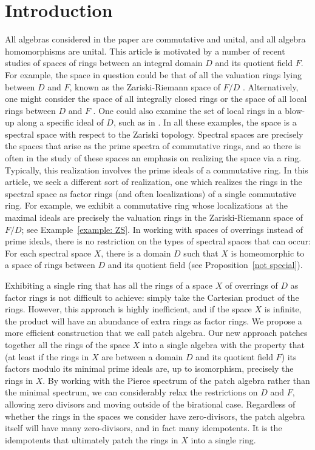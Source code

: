 \documentclass[11pt]{amsart}
\theoremstyle{definition}
\begin{document}
\tableofcontents

\section{Introduction}

All algebras considered in the paper are commutative and unital, and all algebra homomorphisms are unital. This article is motivated by a number of recent studies of spaces of rings between an integral domain $D$ and its quotient field $F$.   For example, the space in question could be that of all the valuation rings lying between $D$ and $F$, known as the Zariski-Riemann space of $F/D$ \cite{FFL,FFL3, HLOT, OZar, OIrr, Spi1, Spi2, Spi3}.  Alternatively, one might consider the space of all integrally closed rings or the space of all local rings between $D$ and $F$  \cite{Fin, FFS, FS, ONoeth}. One could also examine the set of local rings in a blow-up along a specific ideal of $D$, such as in \cite{OZar}. In all these examples, the space is a spectral space with respect to the Zariski topology. Spectral spaces are precisely the spaces that arise as the prime spectra of commutative rings, and so there is often in the study of these spaces an emphasis on realizing the space via a ring. Typically, this realization involves the prime ideals of a commutative ring.  In this article, we seek a different sort of realization, one which realizes the rings in the spectral space as factor rings (and often localizations) of a single commutative ring. For example, we exhibit a commutative ring whose localizations at the maximal ideals are precisely the valuation rings in the Zariski-Riemann space of $F/D$; see Example~\ref{example: ZS}. In working with spaces of overrings instead of  prime ideals, there is no restriction on the types of spectral spaces that can occur: For each  spectral space $X$, there is a domain $D$ such that $X$  is homeomorphic to a space of rings between $D$ and  its quotient field (see Proposition~\ref{not special}).

Exhibiting a single ring that has all the rings of a space $X$ of overrings of $D$ as factor rings is not difficult to achieve: simply take the Cartesian product of the rings. However, this approach is highly inefficient, and if the space $X$ is infinite, the product will have an abundance of extra rings as factor rings. We propose a more efficient construction that we call patch algebra. Our new approach patches together all the rings of the space $X$ into a single algebra with the property that (at least if the rings in $X$ are between a domain $D$ and its quotient field $F$) its factors modulo its minimal prime ideals are, up to isomorphism, precisely the rings in $X$. By working with the Pierce spectrum of the patch algebra rather than the minimal spectrum, we can considerably relax the restrictions on $D$ and $F$, allowing zero divisors and moving outside of the birational case. Regardless of whether the rings in the spaces we consider have zero-divisors, the patch algebra itself will have many zero-divisors, and in fact many idempotents. It is the idempotents that ultimately patch the rings in $X$ into a single ring. 
\end{document}
